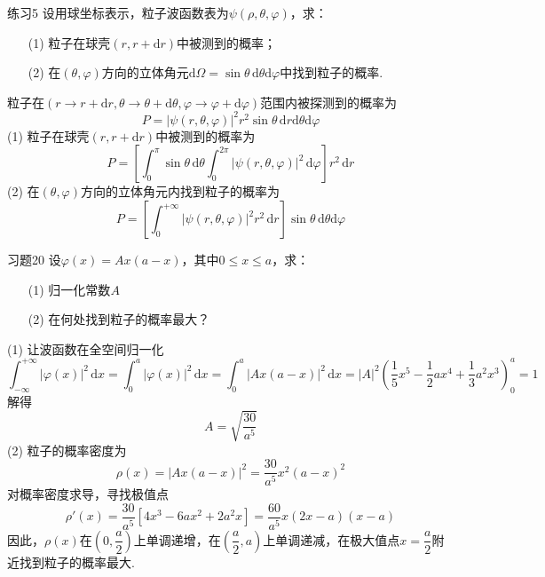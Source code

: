\begin{question}{练习5}
    设用球坐标表示，粒子波函数表为$\psi(\rho, \theta, \varphi)$，求：
    \begin{enumerate}
        \item[(1)] 粒子在球壳$(r, r+\mathrm{d}r)$中被测到的概率；
        \item[(2)] 在$(\theta, \varphi)$方向的立体角元$\mathrm{d}\Omega=\sin\theta\,\mathrm{d}\theta\mathrm{d}\varphi$中找到粒子的概率.
    \end{enumerate}
\end{question}
\begin{solution}
    粒子在$(r\to r+\mathrm{d}r, \theta \to \theta+\mathrm{d}\theta, \varphi \to \varphi+\mathrm{d}\varphi)$范围内被探测到的概率为
    $$
        P = \left|\psi(r, \theta, \varphi)\right|^2r^2\sin\theta \,\mathrm{d}r\mathrm{d}\theta\mathrm{d}\varphi
    $$
    (1) 粒子在球壳$(r, r+\mathrm{d}r)$中被测到的概率为
    $$
        P=\left[\int_{0}^{\pi}\sin\theta\,\mathrm{d}\theta\int_{0}^{2\pi}\left|\psi(r, \theta, \varphi)\right|^2\,\mathrm{d}\varphi\right]r^2\,\mathrm{d}r
    $$
    (2) 在$(\theta, \varphi)$方向的立体角元内找到粒子的概率为
    $$
        P=\left[\int_{0}^{+\infty}\left|\psi(r, \theta, \varphi)\right|^2r^2\,\mathrm{d}r\right]\sin\theta\,\mathrm{d}\theta\mathrm{d}\varphi
    $$
\end{solution}


\begin{question}{习题20}
    设$\varphi(x)=Ax(a-x)$，其中$0 \leqslant x \leqslant a$，求：
    \begin{enumerate}
        \item[(1)] 归一化常数$A$
        \item[(2)] 在何处找到粒子的概率最大？
    \end{enumerate}
\end{question}
\begin{solution}
    (1) 让波函数在全空间归一化
    $$
        \int_{-\infty}^{+\infty}|\varphi(x)|^2\,\mathrm{d}x
        = \int_0^a |\varphi(x)|^2\,\mathrm{d}x
        = \int_0^a |Ax(a-x)|^2\,\mathrm{d}x
        = |A|^2\left(\frac15x^5-\frac12ax^4+\frac13a^2x^3\right)_0^a
        = 1
    $$
    解得
    $$
        A=\sqrt{\frac{30}{a^5}}
    $$
    (2) 粒子的概率密度为
    $$
        \rho(x) = |Ax(a-x)|^2 = \frac{30}{a^5}x^2(a-x)^2
    $$
    对概率密度求导，寻找极值点
    $$
        \rho'(x)=\frac{30}{a^5}[4x^3-6ax^2+2a^2x]=\frac{60}{a^5}x(2x-a)(x-a)
    $$
    因此，$\rho(x)$在$\left(0,\dfrac{a}{2}\right)$上单调递增，在$\left(\dfrac{a}{2},a\right)$上单调递减，在极大值点$x=\dfrac{a}{2}$附近找到粒子的概率最大.
\end{solution}


